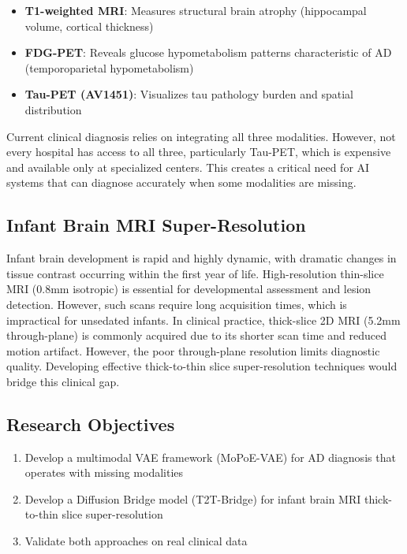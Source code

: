 \documentclass[11pt,a4paper]{article}
\begin{document}
\begin{itemize}
    \item \textbf{T1-weighted MRI}: Measures structural brain atrophy (hippocampal volume, cortical thickness)
    \item \textbf{FDG-PET}: Reveals glucose hypometabolism patterns characteristic of AD (temporoparietal hypometabolism)
    \item \textbf{Tau-PET (AV1451)}: Visualizes tau pathology burden and spatial distribution
\end{itemize}

Current clinical diagnosis relies on integrating all three modalities. However, not every hospital has access to all three, particularly Tau-PET, which is expensive and available only at specialized centers. This creates a critical need for AI systems that can diagnose accurately when some modalities are missing.

\subsection{Infant Brain MRI Super-Resolution}
Infant brain development is rapid and highly dynamic, with dramatic changes in tissue contrast occurring within the first year of life. High-resolution thin-slice MRI (0.8mm isotropic) is essential for developmental assessment and lesion detection. However, such scans require long acquisition times, which is impractical for unsedated infants. In clinical practice, thick-slice 2D MRI (5.2mm through-plane) is commonly acquired due to its shorter scan time and reduced motion artifact. However, the poor through-plane resolution limits diagnostic quality. Developing effective thick-to-thin slice super-resolution techniques would bridge this clinical gap.

\subsection{Research Objectives}
\begin{enumerate}
    \item Develop a multimodal VAE framework (MoPoE-VAE) for AD diagnosis that operates with missing modalities
    \item Develop a Diffusion Bridge model (T2T-Bridge) for infant brain MRI thick-to-thin slice super-resolution
    \item Validate both approaches on real clinical data
\end{enumerate}
\end{document}
